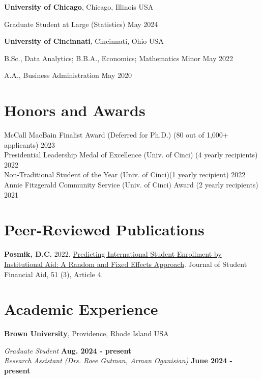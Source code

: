 \documentclass[margin,line]{res}
\newenvironment{list1}{
  \begin{list}{\ding{113}}{%
      \setlength{\itemsep}{0in}
      \setlength{\parsep}{0in} \setlength{\parskip}{0in}
      \setlength{\topsep}{0in} \setlength{\partopsep}{0in} 
      \setlength{\leftmargin}{0.17in}}}{\end{list}}
\begin{document}
\begin{resume}
{\bf University of Chicago}, Chicago, Illinois USA\\
\vspace*{-.15in}
\begin{list1}
\item[] Graduate Student at Large (Statistics) \hfill May 2024
\end{list1}

{\bf University of Cincinnati}, Cincinnati, Ohio USA\\
\vspace*{-.15in}
\begin{list1}
\item[] B.Sc., Data Analytics; B.B.A., Economics; Mathematics Minor \hfill May 2022
\item[] A.A., Business Administration \hfill May 2020
\end{list1}


\section{\sc Honors and Awards} 
McCall MacBain Finalist Award (Deferred for Ph.D.) (80 out of 1,000+ applicants) \hfill 2023 \\  
Presidential Leadership Medal of Excellence (Univ. of Cinci) (4 yearly recipients) \hfill 2022 \\ 
Non-Traditional Student of the Year (Univ. of Cinci)(1 yearly recipient) \hfill 2022 \\
Annie Fitzgerald Community Service (Univ. of Cinci) Award (2 yearly recipients) \hfill 2021


\section{\sc Peer-Reviewed Publications}
{\bf Posmik, D.C.} 2022. \href{https://ir.library.louisville.edu/jsfa/vol51/iss3/4/}{Predicting International Student Enrollment by Institutional Aid: A Random and Fixed Effects Approach}. Journal of Student Financial Aid, 51 (3), Article 4.  


\section{\sc Academic Experience}
{\bf Brown University}, Providence, Rhode Island USA

\vspace{-.3cm}
{\em Graduate Student} \hfill {\bf Aug. 2024 - present}\\
{\em Research Assistant (Drs. Roee Gutman, Arman Oganisian)} \hfill {\bf June 2024 - present}\\


\end{resume}
\end{document}

